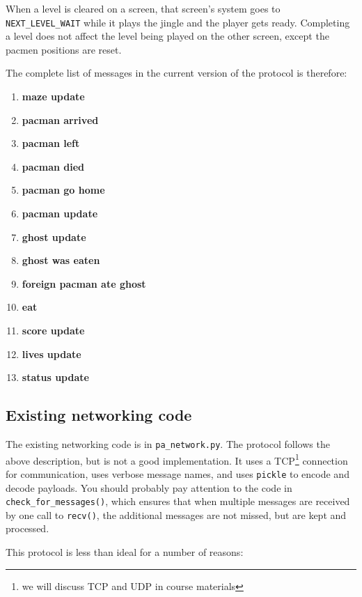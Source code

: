 \documentclass{article}
\begin{document}
When a  level is  cleared on  a screen, that  screen's system  goes to
{\tt NEXT\_LEVEL\_WAIT} while it  plays the jingle and the  player gets ready.
Completing a level does not affect the level being played on the other
screen, except the pacmen positions are reset.

The complete list of messages in the current version of the protocol is therefore:
\begin{enumerate}
\item {\bf maze update}
\item {\bf pacman arrived}
\item {\bf pacman left}
\item {\bf pacman died}
\item {\bf pacman go home}
\item {\bf pacman update}
\item {\bf ghost update}
\item {\bf ghost was eaten}
\item {\bf foreign pacman ate ghost}
\item {\bf eat}
\item {\bf score update}
\item {\bf lives update}
\item {\bf status update}
\end{enumerate}

\subsection{Existing networking code}

The existing networking code is in {\tt pa\_network.py}.  The protocol
follows the above description, but is not a good implementation.  It
uses a TCP\footnote{we will discuss TCP and UDP in course materials} connection for communication, uses verbose message names,
and uses {\tt pickle} to encode and decode payloads.  You should probably
pay attention to the code in {\tt check\_for\_messages()}, which ensures that
when multiple messages are received by one call to {\tt recv()}, the
additional messages are not missed, but are kept and processed.

This protocol is less than ideal for a number of reasons:
\end{document}
